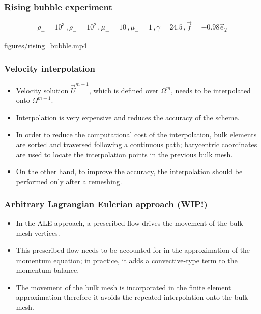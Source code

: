 \documentclass{beamer}
\begin{document}
\begin{frame}
\frametitle{Rising bubble experiment}

\begin{equation*}
\rho_+ = 10^3\,, \rho_- = 10^2\,, \mu_+ = 10\,, \mu_- = 1\,, \gamma = 24.5\,,
\vec f = -0.98\vec e_2
\end{equation*}

\centering

{figures/rising_bubble.mp4}

\end{frame}

\begin{frame}
\frametitle{Velocity interpolation}

\begin{itemize}
\item Velocity solution $\vec U^{m+1}$, which is defined over $\Omega^m$, needs
to be interpolated onto $\Omega^{m+1}$.

\pause

\item Interpolation is very expensive and reduces the accuracy of the scheme.

\pause

\item In order to reduce the computational cost of the interpolation, bulk
elements are sorted and traversed following a continuous path; barycentric
coordinates are used to locate the interpolation points in the previous bulk
mesh.

\pause

\item On the other hand, to improve the accuracy, the interpolation should be
performed only after a remeshing.
\end{itemize}

\end{frame}

\begin{frame}
\frametitle{Arbitrary Lagrangian Eulerian approach (WIP!)}

\begin{itemize}
\item In the ALE approach, a prescribed flow drives the movement of the bulk
mesh vertices.

\pause

\item This prescribed flow needs to be accounted for in the approximation of the
momentum equation; in practice, it adds a convective-type term to the momentum
balance.

\pause

\item The movement of the bulk mesh is incorporated in the finite element
approximation therefore it avoids the repeated interpolation onto the bulk mesh.
\end{itemize}

\end{frame}
\end{document}
